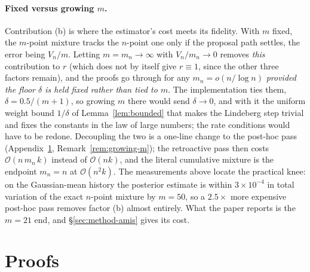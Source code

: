 \documentclass[10pt]{article}
\theoremstyle{plain}
\theoremstyle{definition}
\begin{document}
\paragraph{Fixed versus growing $m$.} Contribution (b) is where the estimator's cost meets its fidelity. With $m$ fixed, the $m$-point mixture tracks the $n$-point one only if the proposal path settles, the error being $V_n/m$. Letting $m=m_n\to\infty$ with $V_n/m_n\to0$ removes \emph{this} contribution to $r$ (which does not by itself give $r\equiv1$, since the other three factors remain), and the proofs go through for any $m_n=o(n/\log n)$ \emph{provided the floor $\delta$ is held fixed rather than tied to $m$}. The implementation ties them, $\delta=0.5/(m{+}1)$, so growing $m$ there would send $\delta\to0$, and with it the uniform weight bound $1/\delta$ of Lemma~\ref{lem:bounded} that makes the Lindeberg step trivial and fixes the constants in the law of large numbers; the rate conditions would have to be redone. Decoupling the two is a one-line change to the post-hoc pass (Appendix~\ref{app:theory}, Remark~\ref{rem:growing-m}); the retroactive pass then costs $\mathcal{O}(n\,m_n\,k)$ instead of $\mathcal{O}(nk)$, and the literal cumulative mixture is the endpoint $m_n=n$ at $\mathcal{O}(n^2k)$. The measurements above locate the practical knee: on the Gaussian-mean history the posterior estimate is within $3\times10^{-4}$ in total variation of the exact $n$-point mixture by $m=50$, so a $2.5\times$ more expensive post-hoc pass removes factor (b) almost entirely. What the paper reports is the $m=21$ end, and \S\ref{sec:method-amis} gives its cost.

\section{Proofs}\label{app:theory}
\end{document}
